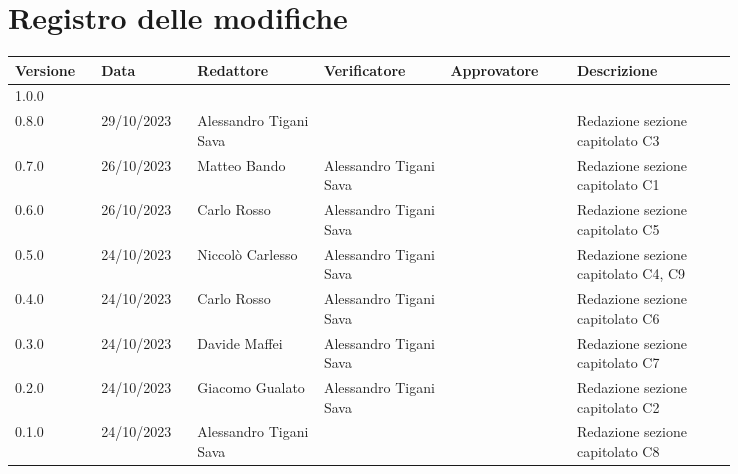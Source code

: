 \section*{Registro delle modifiche}
{
\renewcommand{\arraystretch}{1.5}
\scriptsize
\begin{tabular}{p{0.10\linewidth}p{0.10\linewidth}p{0.15\linewidth}p{0.15\linewidth}p{0.15\linewidth}p{0.19\linewidth}}
    \textbf{Versione}   & \textbf{Data} & \textbf{Redattore}     & \textbf{Verificatore} & \textbf{Approvatore}  & \textbf{Descrizione}  \\
    \hline
    1.0.0 \\
    \hline
    0.8.0   & 29/10/2023    & Alessandro Tigani Sava &                          &   & Redazione sezione capitolato C3   \\
    \hline
    0.7.0   & 26/10/2023    & Matteo Bando           & Alessandro Tigani Sava   &   & Redazione sezione capitolato C1   \\
    \hline
    0.6.0   & 26/10/2023    & Carlo Rosso            & Alessandro Tigani Sava   &   & Redazione sezione capitolato C5   \\   
    \hline 
    0.5.0   & 24/10/2023    & Niccolò Carlesso       & Alessandro Tigani Sava   &   & Redazione sezione capitolato C4, C9  	\\
    \hline
    0.4.0   & 24/10/2023    & Carlo Rosso            & Alessandro Tigani Sava   &   & Redazione sezione capitolato C6  	\\
    \hline
    0.3.0   & 24/10/2023    & Davide Maffei          & Alessandro Tigani Sava   &   & Redazione sezione capitolato C7   \\
    \hline
    0.2.0   & 24/10/2023    & Giacomo Gualato        & Alessandro Tigani Sava   &   & Redazione sezione capitolato C2   \\
    \hline
    0.1.0   & 24/10/2023    & Alessandro Tigani Sava &                          &   & Redazione sezione capitolato C8   \\    
    \hline
\end{tabular}
}